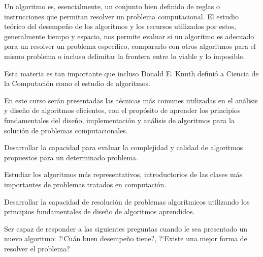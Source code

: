 \begin{syllabus}


\begin{justification}
Un algoritmo es, esencialmente, un conjunto bien definido de reglas o instrucciones
que permitan resolver un problema computacional. El estudio teórico del desempeño
de los algoritmos y los recursos utilizados por estos, generalmente tiempo y espacio, 
nos permite evaluar si un algoritmo es adecuado para un resolver un problema 
específico, compararlo con otros algoritmos para el mismo problema o incluso
delimitar la frontera entre lo viable y lo imposible.

Esta materia es tan importante que incluso Donald E. Knuth definió a
Ciencia de la Computación como el estudio de algoritmos.

En este curso serán presentadas las técnicas más comunes utilizadas en el análisis y diseño de 
algoritmos eficientes, con el propósito de aprender los principios fundamentales
del diseño, implementación y análisis de algoritmos para la solución de problemas
computacionales.
\end{justification}

\begin{goals} 
\item Desarrollar la capacidad para evaluar la complejidad y calidad de algoritmos propuestos para un determinado problema.
\item Estudiar los algoritmos más representativos, introductorios de las clases más importantes de problemas tratados en computación.
\item Desarrollar la capacidad de resolución de problemas algorítmicos utilizando los principios fundamentales de diseño de algoritmos aprendidos.
\item Ser capaz de responder a las siguientes preguntas cuando le sea presentado un nuevo algoritmo: ?`Cuán buen desempeño tiene?, ?`Existe una mejor forma de resolver el problema?
\end{goals}

\begin{outcomes}
    \item {} 
    \item {} 
    \item {}
    \item {} 
\end{outcomes}


\end{syllabus}
